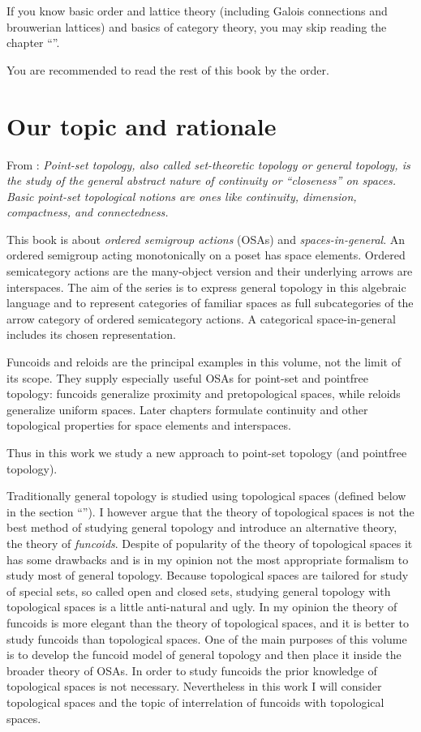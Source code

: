 If you know basic order and lattice theory (including Galois connections
and brouwerian lattices) and basics of category theory, you may skip
reading the chapter ``''.

You are recommended to read the rest of this book by the order.


\section{Our topic and rationale}

From \cite{mw-gen-top}: \emph{Point-set topology, also called set-theoretic
topology or general topology, is the study of the general abstract
nature of continuity or ``closeness'' on spaces. Basic point-set
topological notions are ones like continuity, dimension, compactness,
and connectedness.}

This book is about \emph{ordered semigroup actions} (OSAs) and
\emph{spaces-in-general}. An ordered semigroup acting monotonically on a
poset has space elements. Ordered semicategory actions are the many-object
version and their underlying arrows are interspaces. The aim of the
series is to express general topology in this algebraic language and to
represent categories of familiar spaces as full subcategories of the
arrow category of ordered semicategory actions. A categorical
space-in-general includes its chosen representation.

Funcoids and reloids are the principal examples in this volume, not the
limit of its scope.  They supply especially useful OSAs for point-set and
pointfree topology: funcoids generalize proximity and pretopological
spaces, while reloids generalize uniform spaces. Later chapters formulate
continuity and other topological properties for space elements and
interspaces.

Thus in this work we study a new approach to point-set topology (and
pointfree topology).

Traditionally general topology is studied using topological spaces
(defined below in the section ``''). I however
argue that the theory of topological spaces is not the best method
of studying general topology and introduce an alternative theory,
the theory of \emph{funcoids}. Despite of popularity of the theory
of topological spaces it has some drawbacks and is in my opinion not
the most appropriate formalism to study most of general topology.
Because topological spaces are tailored for study of special sets,
so called open and closed sets, studying general topology with topological
spaces is a little anti-natural and ugly. In my opinion the theory
of funcoids is more elegant than the theory of topological spaces,
and it is better to study funcoids than topological spaces. One of
the main purposes of this volume is to develop the funcoid model of
general topology and then place it inside the broader theory of OSAs.
In order to study funcoids the prior knowledge
of topological spaces is not necessary. Nevertheless in this work
I will consider topological spaces and the topic of interrelation
of funcoids with topological spaces.

